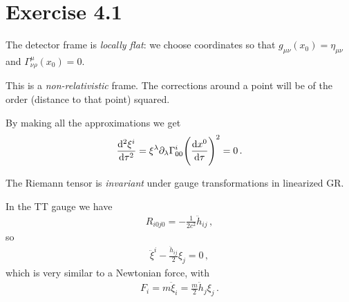 \documentclass[main.tex]{subfiles}
\begin{document}
\section*{Exercise 4.1}

The detector frame is \emph{locally flat}:
we choose coordinates so that \(g_{\mu \nu } (x_0 ) = \eta_{\mu \nu }\) and \(\Gamma^{\mu }_{\nu \rho } (x_0) = 0\). 

This is a \emph{non-relativistic} frame. 
The corrections around a point will be of the order (distance to that point) squared. 

By making all the approximations we get 
%
\begin{align}
\dv[2]{\xi^{i}}{\tau } = \xi^{\lambda } \partial_{\lambda } \Gamma^{i}_{00} \qty(\dv{x^{0}}{\tau })^2 = 0
\,.
\end{align}

The Riemann tensor is \emph{invariant} under gauge transformations in linearized GR.

In the TT gauge we have 
%
\begin{align}
R_{i0j0} = - \frac{1}{2 c^2} \ddot{h}_{ij}
\,,
\end{align}
%
so 
%
\begin{align}
\ddot{\xi}^{i} - \frac{\ddot{h}_{ij}}{2} \xi_{j} = 0
\,,
\end{align}
%
which is very similar to a Newtonian force, with 
%
\begin{align}
F_{i} = m \ddot{\xi}_{i} = \frac{m}{2} \ddot{h}_{j} \xi_{j}
\,.
\end{align}
\end{document}
